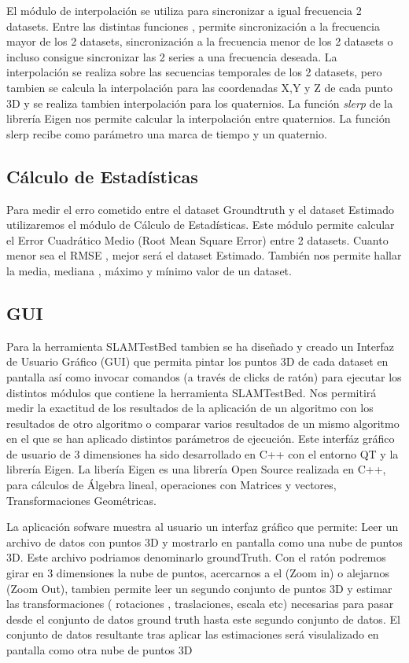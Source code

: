 	El módulo de interpolación se utiliza para sincronizar a igual frecuencia 2 datasets.
	Entre las distintas funciones , permite sincronización a la frecuencia mayor de los 2 datasets, sincronización a la frecuencia menor de los 2 datasets o incluso consigue sincronizar las 2 series a una frecuencia deseada. La interpolación se realiza sobre las secuencias temporales de los 2 datasets, pero tambien se calcula la interpolación para las coordenadas X,Y y Z de cada punto 3D y se realiza tambien interpolación para los quaternios. La función \textit{slerp} de la librería Eigen nos permite calcular la interpolación entre quaternios. La función slerp recibe como parámetro una marca de tiempo y un quaternio.

\subsection{Cálculo de Estadísticas}

Para medir el erro cometido entre el dataset Groundtruth y el dataset Estimado utilizaremos el módulo de Cálculo de Estadísticas.
Este módulo permite calcular el Error Cuadrático Medio (Root Mean Square Error) entre 2 datasets.
Cuanto menor sea el RMSE , mejor será el dataset Estimado.
También nos permite hallar la media, mediana , máximo y mínimo valor de un dataset.


\subsection{GUI}

Para la herramienta SLAMTestBed tambien se ha diseñado y creado un Interfaz de Usuario Gráfico (GUI) que permita pintar los puntos 3D de cada dataset en pantalla así como invocar comandos (a través de clicks de ratón) para ejecutar los distintos módulos que contiene la herramienta SLAMTestBed.
Nos permitirá medir la exactitud de los resultados de la aplicación de un algoritmo con los resultados de otro algoritmo o comparar varios resultados de un mismo algoritmo en el que se han aplicado distintos parámetros de ejecución.
Este interfáz gráfico de usuario de 3 dimensiones ha sido desarrollado en C++ con el entorno QT y la librería Eigen. La libería Eigen es una librería Open Source realizada en C++, para cálculos de Álgebra lineal, operaciones con Matrices y vectores, Transformaciones Geométricas. 

La aplicación sofware muestra al usuario un interfaz gráfico que permite:
Leer un archivo de datos con puntos 3D y mostrarlo en pantalla como una nube de puntos 3D. Este archivo podriamos denominarlo groundTruth.
Con el ratón podremos girar en 3 dimensiones la nube de puntos, acercarnos a el (Zoom in) o alejarnos (Zoom Out),
tambien permite leer un segundo conjunto de puntos 3D y estimar las transformaciones ( rotaciones , traslaciones, escala etc)  necesarias para pasar desde el conjunto de datos ground truth hasta este segundo conjunto de datos. El conjunto de datos resultante tras aplicar las estimaciones será visulalizado en pantalla como otra nube de puntos 3D

